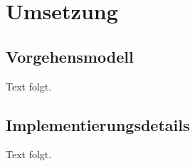 \chapter{Umsetzung}

\section{Vorgehensmodell}
Text folgt.

\section{Implementierungsdetails}
Text folgt.
